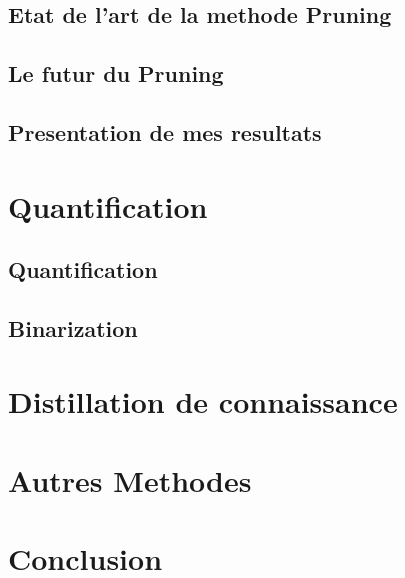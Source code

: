\documentclass[twoside,twocolumn]{article}
\begin{document}
\subsection{Etat de l'art de la methode Pruning}
\subsection{Le futur du Pruning}
\subsection{Presentation de mes resultats}

\section{Quantification}%
\subsection{Quantification}
\subsection{Binarization}

\section{Distillation de connaissance} %


\section{Autres Methodes}%


\section{Conclusion}%



 

\end{document}

